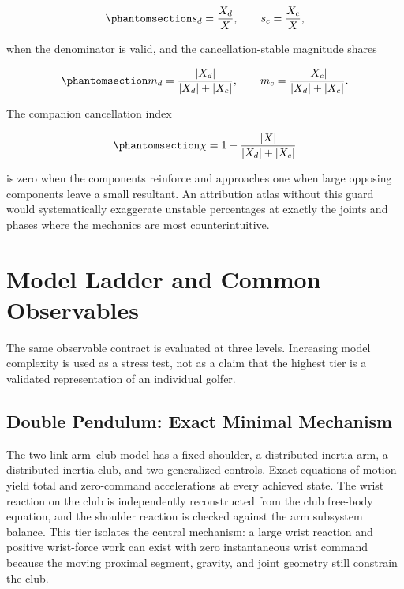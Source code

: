 \documentclass[
  letterpaper,
]{report}
\begin{document}
\begin{equation}\phantomsection\label{eq-signed-shares}{
s_d=\frac{X_d}{X},\qquad s_c=\frac{X_c}{X},
}\end{equation}

when the denominator is valid, and the cancellation-stable magnitude
shares

\begin{equation}\phantomsection\label{eq-magnitude-shares}{
m_d=\frac{|X_d|}{|X_d|+|X_c|},\qquad
m_c=\frac{|X_c|}{|X_d|+|X_c|}.
}\end{equation}

The companion cancellation index

\begin{equation}\phantomsection\label{eq-cancellation-index}{
\chi=1-\frac{|X|}{|X_d|+|X_c|}
}\end{equation}

is zero when the components reinforce and approaches one when large
opposing components leave a small resultant. An attribution atlas
without this guard would systematically exaggerate unstable percentages
at exactly the joints and phases where the mechanics are most
counterintuitive.

\section{Model Ladder and Common
Observables}\label{sec-attribution-model-ladder}

The same observable contract is evaluated at three levels. Increasing
model complexity is used as a stress test, not as a claim that the
highest tier is a validated representation of an individual golfer.

\subsection{Double Pendulum: Exact Minimal
Mechanism}\label{sec-attribution-double}

The two-link arm--club model has a fixed shoulder, a distributed-inertia
arm, a distributed-inertia club, and two generalized controls. Exact
equations of motion yield total and zero-command accelerations at every
achieved state. The wrist reaction on the club is independently
reconstructed from the club free-body equation, and the shoulder
reaction is checked against the arm subsystem balance. This tier
isolates the central mechanism: a large wrist reaction and positive
wrist-force work can exist with zero instantaneous wrist command because
the moving proximal segment, gravity, and joint geometry still constrain
the club.
\end{document}
